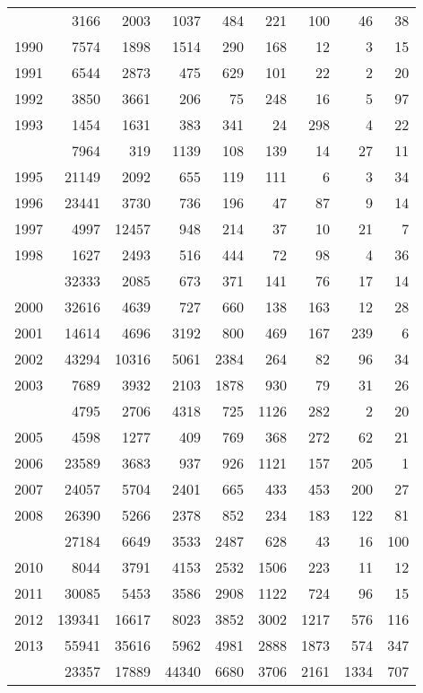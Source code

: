 \documentclass[
]{article}
\begin{document}
\begin{longtable}[t]{lrrrrrrrr}
\endfoot
\bottomrule
\endlastfoot
1989 & 3166 & 2003 & 1037 & 484 & 221 & 100 & 46 & 38\\
1990 & 7574 & 1898 & 1514 & 290 & 168 & 12 & 3 & 15\\
1991 & 6544 & 2873 & 475 & 629 & 101 & 22 & 2 & 20\\
1992 & 3850 & 3661 & 206 & 75 & 248 & 16 & 5 & 97\\
1993 & 1454 & 1631 & 383 & 341 & 24 & 298 & 4 & 22\\
\addlinespace
1994 & 7964 & 319 & 1139 & 108 & 139 & 14 & 27 & 11\\
1995 & 21149 & 2092 & 655 & 119 & 111 & 6 & 3 & 34\\
1996 & 23441 & 3730 & 736 & 196 & 47 & 87 & 9 & 14\\
1997 & 4997 & 12457 & 948 & 214 & 37 & 10 & 21 & 7\\
1998 & 1627 & 2493 & 516 & 444 & 72 & 98 & 4 & 36\\
\addlinespace
1999 & 32333 & 2085 & 673 & 371 & 141 & 76 & 17 & 14\\
2000 & 32616 & 4639 & 727 & 660 & 138 & 163 & 12 & 28\\
2001 & 14614 & 4696 & 3192 & 800 & 469 & 167 & 239 & 6\\
2002 & 43294 & 10316 & 5061 & 2384 & 264 & 82 & 96 & 34\\
2003 & 7689 & 3932 & 2103 & 1878 & 930 & 79 & 31 & 26\\
\addlinespace
2004 & 4795 & 2706 & 4318 & 725 & 1126 & 282 & 2 & 20\\
2005 & 4598 & 1277 & 409 & 769 & 368 & 272 & 62 & 21\\
2006 & 23589 & 3683 & 937 & 926 & 1121 & 157 & 205 & 1\\
2007 & 24057 & 5704 & 2401 & 665 & 433 & 453 & 200 & 27\\
2008 & 26390 & 5266 & 2378 & 852 & 234 & 183 & 122 & 81\\
\addlinespace
2009 & 27184 & 6649 & 3533 & 2487 & 628 & 43 & 16 & 100\\
2010 & 8044 & 3791 & 4153 & 2532 & 1506 & 223 & 11 & 12\\
2011 & 30085 & 5453 & 3586 & 2908 & 1122 & 724 & 96 & 15\\
2012 & 139341 & 16617 & 8023 & 3852 & 3002 & 1217 & 576 & 116\\
2013 & 55941 & 35616 & 5962 & 4981 & 2888 & 1873 & 574 & 347\\
\addlinespace
2014 & 23357 & 17889 & 44340 & 6680 & 3706 & 2161 & 1334 & 707\\

\end{longtable}
\end{document}
